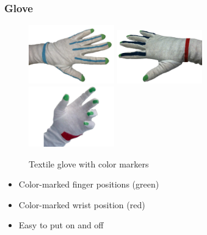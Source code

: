 \documentclass{beamer}
\begin{document}
	\begin{frame}
		\frametitle{Glove}
		\begin{figure}
			\hspace*{-1cm}
			\includegraphics[width=0.33\textwidth]{images/glovev1} \hspace*{0.2cm}
			\includegraphics[width=0.33\textwidth]{images/glovev2} \hspace*{0.2cm}
			\includegraphics[width=0.33\textwidth]{images/glovev3} 
			\caption{Textile glove with color markers}
		\end{figure}
		\vspace*{-0.5cm}
		\begin{itemize}	
			\item Color-marked finger positions (green)
			\item Color-marked wrist position (red)
			\item Easy to put on and off
		\end{itemize}
	\end{frame}
\end{document}
